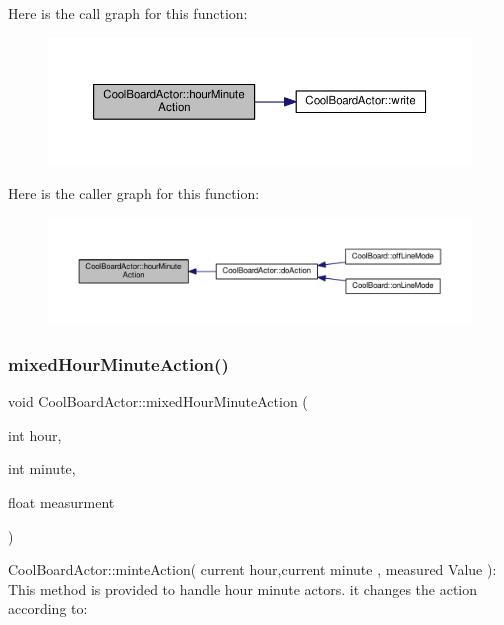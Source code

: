Here is the call graph for this function\+:\nopagebreak
\begin{figure}[H]
\begin{center}
\leavevmode
\includegraphics[width=350pt]{dc/d69/class_cool_board_actor_a1eb1fbca19bc80aad20d2686d52317f8_cgraph}
\end{center}
\end{figure}
Here is the caller graph for this function\+:\nopagebreak
\begin{figure}[H]
\begin{center}
\leavevmode
\includegraphics[width=350pt]{dc/d69/class_cool_board_actor_a1eb1fbca19bc80aad20d2686d52317f8_icgraph}
\end{center}
\end{figure}
\mbox{\label{class_cool_board_actor_ae6b2a17b0e73cfeb353ded2cc4e08109}} 
\subsubsection{\texorpdfstring{mixed\+Hour\+Minute\+Action()}{mixedHourMinuteAction()}}
{\footnotesize\ttfamily void Cool\+Board\+Actor\+::mixed\+Hour\+Minute\+Action (\begin{DoxyParamCaption}\item[{int}]{hour,  }\item[{int}]{minute,  }\item[{float}]{measurment }\end{DoxyParamCaption})}

Cool\+Board\+Actor\+::minte\+Action( current hour,current minute , measured Value )\+: This method is provided to handle hour minute actors. it changes the action according to\+:

